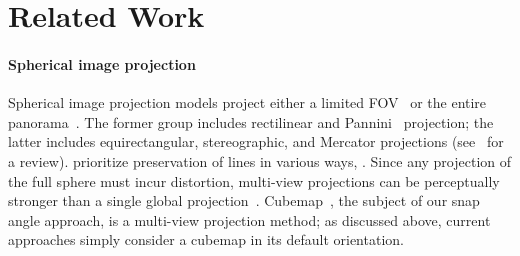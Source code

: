 \section{Related Work} \label{sec:related}

\paragraph{Spherical image projection}

Spherical image projection models project either a limited FOV~\cite{sharpless2010pannini,chang2013rectangling} or the entire panorama~\cite{snyder1997flattening,zelnik2005squaring,greene1986environment}.  The former group includes rectilinear and Pannini~\cite{sharpless2010pannini} projection; the latter includes equirectangular, stereographic, and Mercator projections (see~\cite{snyder1997flattening} for a review).   %
prioritize preservation of lines in various ways, . Since any projection of the full sphere must incur distortion, multi-view projections can be perceptually stronger than a single global projection~\cite{zelnik2005squaring}.  Cubemap~\cite{greene1986environment}, the subject of our snap angle approach, is a multi-view projection method; as discussed above, current approaches simply consider a cubemap in its default orientation.






\vspace*{-0.1in}
